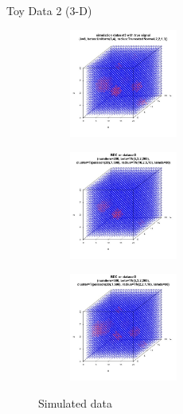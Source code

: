 \documentclass[10pt,mathserif]{beamer}
\begin{document}
\begin{frame}{Toy Data 2 (3-D)}
\begin{figure}[t!]
    \centering
    \begin{subfigure}[t]{0.3\textwidth}
        \centering
        \includegraphics[height=1.4in, width=1.4in]{../simulation_data3.jpg}
        \caption{}
    \end{subfigure}%
    \begin{subfigure}[t]{0.3\textwidth}
        \centering
        \includegraphics[height=1.4in, width=1.4in]{../radius10.jpg}
        \caption{}
    \end{subfigure}%
        \begin{subfigure}[t]{0.3\textwidth}
        \centering
        \includegraphics[height=1.4in, width=1.4in]{../best3.jpg}
        \caption{}
    \end{subfigure}
    \caption{Simulated data}
\end{figure}
\end{frame}
\end{document}
